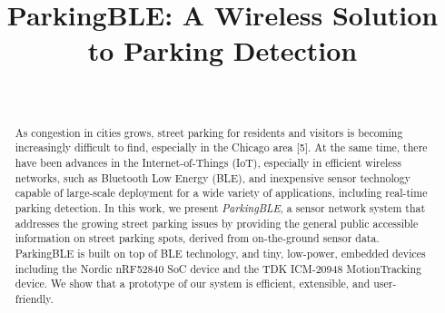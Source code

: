 \documentclass[sigconf]{acmart}
\begin{document}

%








\title{ParkingBLE: A Wireless Solution to Parking Detection
}


%


\author{
     \\
}

\begin{abstract}
As congestion in cities grows, street parking for residents and visitors is
becoming increasingly difficult to find, especially in the Chicago area [5].
At the same time, there have been advances in the Internet-of-Things (IoT),
especially in efficient wireless networks, such as Bluetooth Low Energy (BLE),
and inexpensive sensor technology capable of large-scale deployment for a
wide variety of applications, including real-time parking detection. In this
work, we present \textit{ParkingBLE}, a sensor network system that addresses the growing
street parking issues by providing the general public accessible information on
street parking spots, derived from on-the-ground sensor data. ParkingBLE is built
on top of BLE technology, and tiny, low-power, embedded devices including the
Nordic nRF52840 SoC device and the TDK ICM-20948 MotionTracking device. We show
that a prototype of our system is efficient, extensible, and user-friendly.
\end{abstract}
\end{document}
